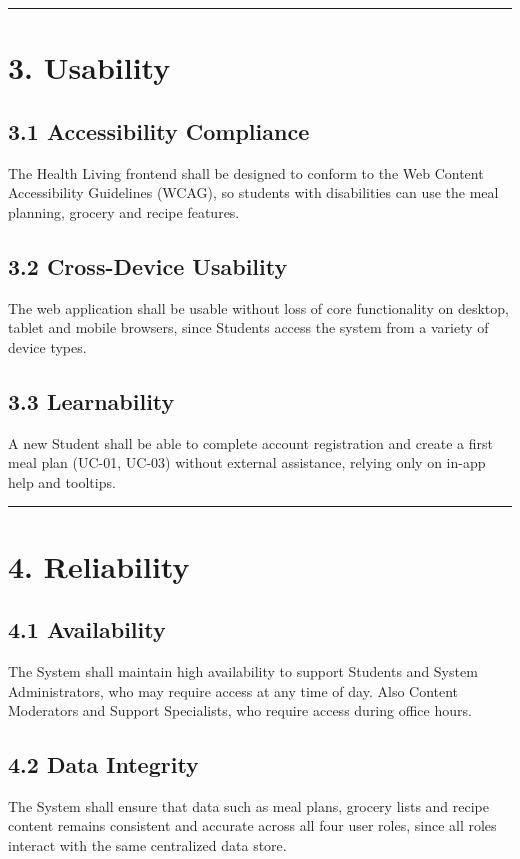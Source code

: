 \documentclass[10pt,letterpaper]{article}
\newcommand{\ucseparator}{\vspace{1em}\noindent\rule{\linewidth}{0.4pt}\vspace{1.5em}}
\begin{document}
\ucseparator

\section*{3. Usability}

\subsection*{3.1 Accessibility Compliance}
The Health Living frontend shall be designed to conform to the Web Content Accessibility Guidelines (WCAG), so students with disabilities can use the meal planning, grocery and recipe features.

\subsection*{3.2 Cross-Device Usability}
The web application shall be usable without loss of core functionality on desktop, tablet and mobile browsers, since Students access the system from a variety of device types.

\subsection*{3.3 Learnability}
A new Student shall be able to complete account registration and create a first meal plan (UC-01, UC-03) without external assistance, relying only on in-app help and tooltips.

\ucseparator

\section*{4. Reliability}

\subsection*{4.1 Availability}
The System shall maintain high availability to support Students and System Administrators, who may require access at any time of day. Also  Content Moderators and Support Specialists, who require access during office hours.

\subsection*{4.2 Data Integrity}
The System shall ensure that data such as meal plans, grocery lists and recipe content remains consistent and accurate across all four user roles, since all roles interact with the same centralized data store.
\end{document}
